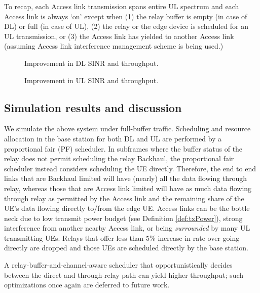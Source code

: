 \documentclass[journal]{IEEEtran}
\begin{document}
To recap, each Access link transmission spans entire UL spectrum and each Access link is always `on' except when (1) the relay buffer is empty (in case of DL) or full (in case of UL), (2) the relay or the edge device is scheduled for an UL transmission, or (3) the Access link has yielded to another Access link (assuming Access link interference management scheme is being used.)

\begin{figure*}
\centering
{}
\caption{Improvement in DL SINR and throughput.}
\label{fig:dlwoIM}
\vspace{-0.1in}
\end{figure*}
\begin{figure*}
\centering
{}
\caption{Improvement in UL SINR and throughput.}
\label{fig:ulwoIM}
\vspace{-0.1in}
\end{figure*}

\subsection{Simulation results and discussion}
\label{sec:simResults}
We simulate the above system under full-buffer traffic. Scheduling and resource allocation in the base station for both DL and UL are performed by a proportional fair (PF) scheduler.  In subframes where the buffer status of the relay does not permit scheduling the relay Backhaul, the proportional fair scheduler instead considers scheduling the UE directly.  Therefore, the end to end links that are Backhaul limited will have (nearly) all the data flowing through relay, whereas those that are Access link limited will have as much data flowing through relay as permitted by the Access link and the remaining share of the UE's data flowing directly to/from the edge UE.  Access links can be the bottle neck due to low transmit power budget (see Definition \ref{def:txPower}), strong interference from another nearby Access link, or being {\em surrounded} by many UL transmitting UEs. Relays that offer less than $5\%$ increase in rate over going directly are dropped and those UEs are scheduled directly by the base station.

A relay-buffer-and-channel-aware scheduler that opportunistically decides between the direct and through-relay path can yield higher throughput; such optimizations once again are deferred to future work.
\end{document}
